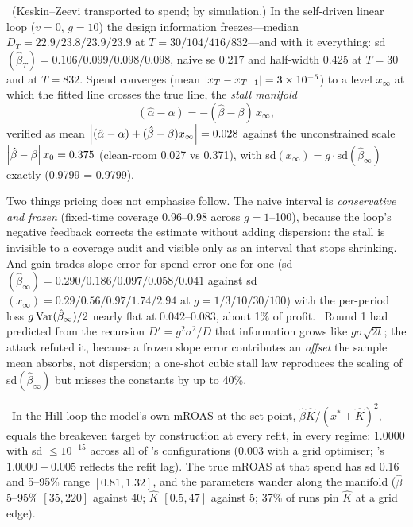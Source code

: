 \begin{proposition}
\label{fb:prop:stall}
\tagTransported\ (Keskin--Zeevi transported to spend; by simulation.) In the self-driven linear loop ($v = 0$, $g = 10$) the design information freezes---median $D_T = 22.9/23.8/23.9/23.9$ at $T = 30/104/416/832$---and with it everything: sd$(\hat\beta_T) = 0.106/0.099/0.098/0.098$, naive se 0.217 and half-width 0.425 at $T = 30$ and at $T = 832$. Spend converges (mean $\left|x_T - x_{T-1}\right| = 3\times10^{-5}$) to a level $x_\infty$ at which the fitted line crosses the true line, the \emph{stall manifold}
\begin{equation}
(\hat\alpha - \alpha) = -(\hat\beta - \beta)\,x_\infty,
\label{eq:fb:manifold}
\end{equation}
verified as mean $\left|(\hat\alpha - \alpha) + (\hat\beta - \beta)x_\infty\right| = 0.028$ against the unconstrained scale $\left|\hat\beta - \beta\right|x_0 = 0.375$ (clean-room 0.027 vs 0.371), with sd$(x_\infty) = g\cdot\mathrm{sd}(\hat\beta_\infty)$ exactly (0.9799 = 0.9799).
\end{proposition}

Two things pricing does not emphasise follow. The naive interval is \emph{conservative and frozen} (fixed-time coverage 0.96--0.98 across $g = 1$--100), because the loop's negative feedback corrects the estimate without adding dispersion: the stall is invisible to a coverage audit and visible only as an interval that stops shrinking. And gain trades slope error for spend error one-for-one (sd$(\hat\beta_\infty) = 0.290/0.186/0.097/0.058/0.041$ against sd$(x_\infty) = 0.29/0.56/0.97/1.74/2.94$ at $g = 1/3/10/30/100$) with the per-period loss $g\operatorname{Var}(\hat\beta_\infty)/2$ nearly flat at 0.042--0.083, about 1\% of profit. \tagRefuted\ Round 1 had predicted from the recursion $D' = g^2\sigma^2/D$ that information grows like $g\sigma\sqrt{2t}$; the attack refuted it, because a frozen slope error contributes an \emph{offset} the sample mean absorbs, not dispersion; a one-shot cubic stall law reproduces the scaling of sd$(\hat\beta_\infty)$ but misses the constants by up to 40\%.

\begin{proposition}
\label{fb:prop:echo}
\tagEstablished\ In the Hill loop the model's own mROAS at the set-point, $\hat\beta\hat K/(x^* + \hat K)^2$, equals the breakeven target by construction at every refit, in every regime: 1.0000 with sd $\le 10^{-15}$ across all of 's configurations (0.003 with a grid optimiser; 's $1.0000 \pm 0.005$ reflects the refit lag). The true mROAS at that spend has sd 0.16 and 5--95\% range $[0.81, 1.32]$, and the parameters wander along the manifold ($\hat\beta$ 5--95\% $[35, 220]$ against 40; $\hat K$ $[0.5, 47]$ against 5; 37\% of runs pin $\hat K$ at a grid edge).
\end{proposition}

